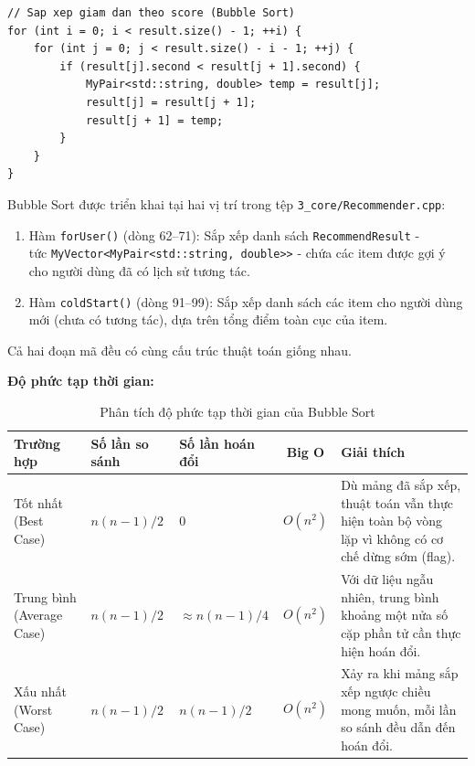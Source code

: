 \documentclass{report}
\begin{document}
\begin{lstlisting}[caption={Thuật toán Bubble Sort trong Recommender::forUser() (File Recommender.cpp)}, label={lst:bubblesort}]
// Sap xep giam dan theo score (Bubble Sort)
for (int i = 0; i < result.size() - 1; ++i) {
    for (int j = 0; j < result.size() - i - 1; ++j) {
        if (result[j].second < result[j + 1].second) {
            MyPair<std::string, double> temp = result[j];
            result[j] = result[j + 1];
            result[j + 1] = temp;
        }
    }
}
\end{lstlisting}

Bubble Sort được triển khai tại hai vị trí trong tệp \texttt{3\_core/Recommender.cpp}:
\begin{enumerate}
    \item Hàm \texttt{forUser()} (dòng 62--71): Sắp xếp danh sách \texttt{RecommendResult} - \\ tức \texttt{MyVector<MyPair<std::string, double>>} - chứa các item được gợi ý cho người dùng đã có lịch sử tương tác.
    \item Hàm \texttt{coldStart()} (dòng 91--99): Sắp xếp danh sách các item cho người dùng mới (chưa có tương tác), dựa trên tổng điểm toàn cục của item.
\end{enumerate}
Cả hai đoạn mã đều có cùng cấu trúc thuật toán giống nhau.

\textbf{Độ phức tạp thời gian:}

\begin{table}[H]
    \centering
    \renewcommand{\arraystretch}{1.4}
    \begin{tabularx}{\textwidth}{|>{\raggedright\arraybackslash}p{2.5cm}|l|l|c|>{\raggedright\arraybackslash}X|}
        \hline
        \textbf{Trường hợp} & \textbf{Số lần so sánh} & \textbf{Số lần hoán đổi} & \textbf{Big O} & \textbf{Giải thích} \\ \hline
        Tốt nhất (Best Case) & $n(n-1)/2$ & $0$ & $O(n^2)$ & Dù mảng đã sắp xếp, thuật toán vẫn thực hiện toàn bộ vòng lặp vì không có cơ chế dừng sớm (flag). \\ \hline
        Trung bình (Average Case) & $n(n-1)/2$ & $\approx n(n-1)/4$ & $O(n^2)$ & Với dữ liệu ngẫu nhiên, trung bình khoảng một nửa số cặp phần tử cần thực hiện hoán đổi. \\ \hline
        Xấu nhất (Worst Case) & $n(n-1)/2$ & $n(n-1)/2$ & $O(n^2)$ & Xảy ra khi mảng sắp xếp ngược chiều mong muốn, mỗi lần so sánh đều dẫn đến hoán đổi. \\ \hline
    \end{tabularx}
    \caption{Phân tích độ phức tạp thời gian của Bubble Sort}
    \label{tab:time_bubble}
\end{table}
\end{document}

